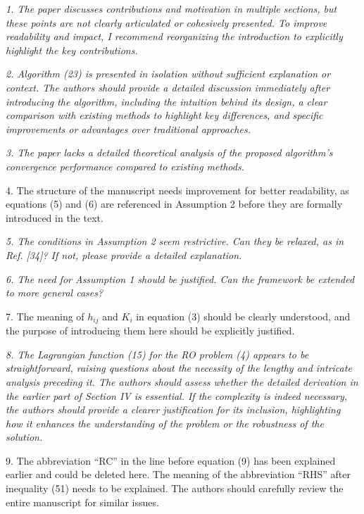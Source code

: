 \documentclass[journal,twoside,web]{ieeecolor}
\begin{document}
\textcolor{reviewerred}{\textit{1. The paper discusses contributions and motivation in multiple sections, but these points are not clearly articulated or cohesively presented. To improve readability and impact, I recommend reorganizing the introduction to explicitly highlight the key contributions.}}

\textcolor{reviewerred}{\textit{2. Algorithm (23) is presented in isolation without sufficient explanation or context. The authors should provide a detailed discussion immediately after introducing the algorithm, including the intuition behind its design, a clear comparison with existing methods to highlight key differences, and specific improvements or advantages over traditional approaches.}}

\textcolor{reviewerred}{\textit{3. The paper lacks a detailed theoretical analysis of the proposed algorithm's convergence performance compared to existing methods.}}

4. The structure of the manuscript needs improvement for better readability, as equations (5) and (6) are referenced in Assumption 2 before they are formally introduced in the text.

\textcolor{reviewerred}{\textit{5. The conditions in Assumption 2 seem restrictive. Can they be relaxed, as in Ref. [34]? If not, please provide a detailed explanation.}}

\textcolor{reviewerred}{\textit{6. The need for Assumption 1 should be justified. Can the framework be extended to more general cases?}}

7. The meaning of $h_{ij}$ and $K_i$ in equation (3) should be clearly understood, and the purpose of introducing them here should be explicitly justified.

\textcolor{reviewerred}{\textit{8. The Lagrangian function (15) for the RO problem (4) appears to be straightforward, raising questions about the necessity of the lengthy and intricate analysis preceding it. The authors should assess whether the detailed derivation in the earlier part of Section IV is essential. If the complexity is indeed necessary, the authors should provide a clearer justification for its inclusion, highlighting how it enhances the understanding of the problem or the robustness of the solution.}}

9. The abbreviation ``RC'' in the line before equation (9) has been explained earlier and could be deleted here. The meaning of the abbreviation ``RHS'' after inequality (51) needs to be explained. The authors should carefully review the entire manuscript for similar issues.
\end{document}
